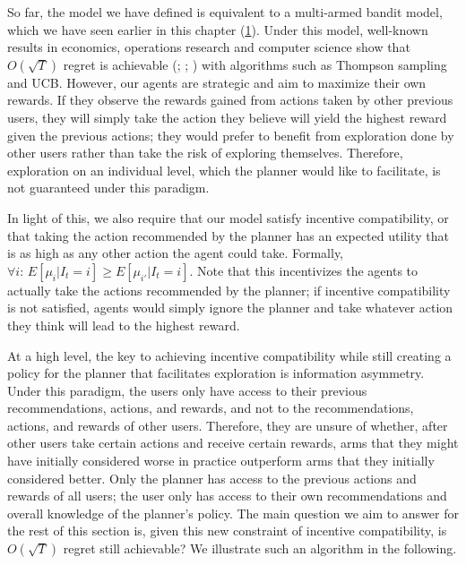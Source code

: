 \documentclass[
  letterpaper,
  numbers=noenddot,
  DIV=11]{scrreprt}
\theoremstyle{definition}
\theoremstyle{plain}
\theoremstyle{plain}
\theoremstyle{remark}
\begin{document}
So far, the model we have defined is equivalent to a multi-armed bandit
model, which we have seen earlier in this chapter
(\hyperref[4optim]{1}). Under this model, well-known results in
economics, operations research and computer science show that
\(O(\sqrt{T})\) regret is achievable
(; ; ) with algorithms such as Thompson sampling and UCB. However, our
agents are strategic and aim to maximize their own rewards. If they
observe the rewards gained from actions taken by other previous users,
they will simply take the action they believe will yield the highest
reward given the previous actions; they would prefer to benefit from
exploration done by other users rather than take the risk of exploring
themselves. Therefore, exploration on an individual level, which the
planner would like to facilitate, is not guaranteed under this paradigm.

In light of this, we also require that our model satisfy incentive
compatibility, or that taking the action recommended by the planner has
an expected utility that is as high as any other action the agent could
take. Formally,
\(\forall i : \, E[\mu_i | I_t = i] \geq E[\mu_{i'} | I_t = i].\) Note
that this incentivizes the agents to actually take the actions
recommended by the planner; if incentive compatibility is not satisfied,
agents would simply ignore the planner and take whatever action they
think will lead to the highest reward.

At a high level, the key to achieving incentive compatibility while
still creating a policy for the planner that facilitates exploration is
information asymmetry. Under this paradigm, the users only have access
to their previous recommendations, actions, and rewards, and not to the
recommendations, actions, and rewards of other users. Therefore, they
are unsure of whether, after other users take certain actions and
receive certain rewards, arms that they might have initially considered
worse in practice outperform arms that they initially considered better.
Only the planner has access to the previous actions and rewards of all
users; the user only has access to their own recommendations and overall
knowledge of the planner's policy. The main question we aim to answer
for the rest of this section is, given this new constraint of incentive
compatibility, is \(O(\sqrt{T})\) regret still achievable? We illustrate
such an algorithm in the following.
\end{document}

